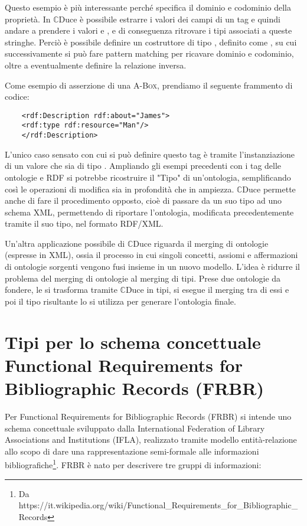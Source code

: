 Questo esempio è più interessante perché specifica il dominio e codominio della proprietà. In $\mathbb{C}$Duce è possibile estrarre i valori dei campi di un tag e 
quindi andare a prendere i valori  e , e di conseguenza ritrovare i tipi associati a queste stringhe. Perciò è possibile definire un costruttore 
di tipo , definito come , su cui successivamente si può fare pattern matching per ricavare dominio e codominio, oltre a 
eventualmente definire la relazione inversa. 

Come esempio di asserzione di una \textsc{A-Box}, prendiamo il seguente frammento di codice:
\begin{verbatim}
	<rdf:Description rdf:about="James">
	<rdf:type rdf:resource="Man"/>
	</rdf:Description>
\end{verbatim}
L'unico caso sensato con cui si può definire questo tag è tramite l'instanziazione di un valore  che sia di tipo . 
Ampliando gli esempi precedenti con i tag delle ontologie e RDF si potrebbe ricostruire il "Tipo" di un'ontologia, semplificando così le operazioni di 
modifica sia in profondità che in  ampiezza. $\mathbb{C}$Duce permette anche di fare il procedimento opposto, cioè di passare da un suo tipo ad uno schema XML, 
permettendo di riportare l'ontologia, modificata precedentemente tramite il suo tipo, nel formato RDF/XML.

Un'altra applicazione possibile di $\mathbb{C}$Duce riguarda il merging di ontologie (espresse in XML), ossia il processo in cui singoli concetti, assiomi e affermazioni di ontologie sorgenti vengono fusi insieme in un nuovo modello. L'idea è ridurre il problema del merging di ontologie al merging di tipi. Prese due ontologie da fondere, le si trasforma tramite $\mathbb{C}$Duce in tipi, si esegue il merging tra di essi e poi il tipo risultante lo si 
utilizza per generare l'ontologia finale.

\section{\large Tipi per lo schema concettuale Functional Requirements for Bibliographic Records (FRBR)}
Per Functional Requirements for Bibliographic Records (FRBR) \cite{frbr} si intende uno schema concettuale sviluppato dalla International Federation of Library 
Associations and Institutions (IFLA), realizzato tramite modello entità-relazione allo scopo di dare una rappresentazione semi-formale alle informazioni 
bibliografiche\footnote{Da https://it.wikipedia.org/wiki/Functional_Requirements_for_Bibliographic_Records}. FRBR è nato per descrivere tre gruppi di informazioni:

